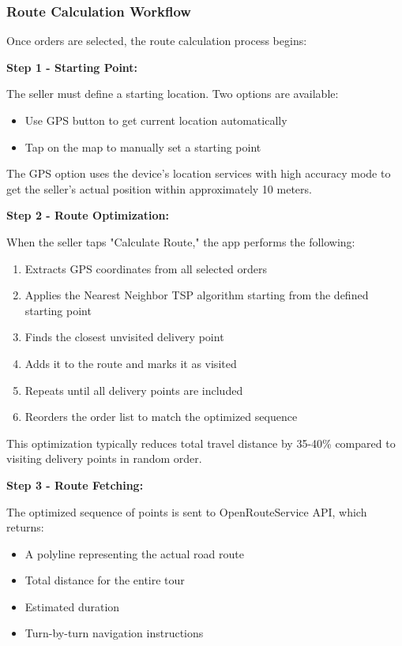 \documentclass[12pt,a4paper]{article}
\begin{document}
\subsubsection{Route Calculation Workflow}

Once orders are selected, the route calculation process begins:

\textbf{Step 1 - Starting Point:}

The seller must define a starting location. Two options are available:
\begin{itemize}
    \item Use GPS button to get current location automatically
    \item Tap on the map to manually set a starting point
\end{itemize}

The GPS option uses the device's location services with high accuracy mode to get the seller's actual position within approximately 10 meters.

\textbf{Step 2 - Route Optimization:}

When the seller taps "Calculate Route," the app performs the following:

\begin{enumerate}
    \item Extracts GPS coordinates from all selected orders
    \item Applies the Nearest Neighbor TSP algorithm starting from the defined starting point
    \item Finds the closest unvisited delivery point
    \item Adds it to the route and marks it as visited
    \item Repeats until all delivery points are included
    \item Reorders the order list to match the optimized sequence
\end{enumerate}

This optimization typically reduces total travel distance by 35-40\% compared to visiting delivery points in random order.

\textbf{Step 3 - Route Fetching:}

The optimized sequence of points is sent to OpenRouteService API, which returns:
\begin{itemize}
    \item A polyline representing the actual road route
    \item Total distance for the entire tour
    \item Estimated duration
    \item Turn-by-turn navigation instructions
\end{itemize}
\end{document}

